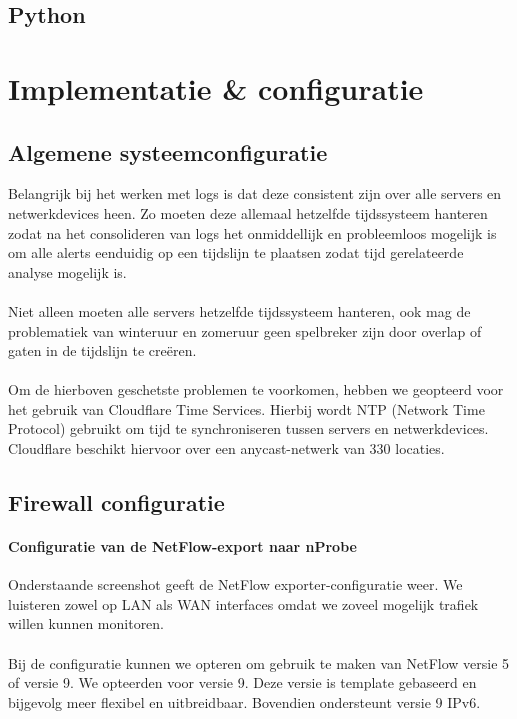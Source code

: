 \subsection{Python}

\section{Implementatie \& configuratie}
\subsection{Algemene systeemconfiguratie}
Belangrijk bij het werken met logs is dat deze consistent zijn over alle servers en netwerkdevices heen. Zo moeten deze allemaal hetzelfde tijdssysteem hanteren zodat na het consolideren van logs het onmiddellijk en probleemloos mogelijk is om alle alerts eenduidig op een tijdslijn te plaatsen zodat tijd gerelateerde analyse mogelijk is.

\paragraph{}
Niet alleen moeten alle servers hetzelfde tijdssysteem hanteren, ook mag de problematiek van winteruur en zomeruur geen spelbreker zijn door overlap of gaten in de tijdslijn te creëren.

\paragraph{}
Om de hierboven geschetste problemen te voorkomen, hebben we geopteerd voor het gebruik van Cloudflare Time Services. Hierbij wordt NTP (Network Time Protocol) gebruikt om tijd te synchroniseren tussen servers en netwerkdevices. Cloudflare beschikt hiervoor over een anycast-netwerk van 330 locaties.

\subsection{Firewall configuratie}

\paragraph{Configuratie van de NetFlow-export naar nProbe}
Onderstaande screenshot geeft de NetFlow exporter-configuratie weer.
We luisteren zowel op LAN als WAN interfaces omdat we zoveel mogelijk trafiek willen kunnen monitoren.

\paragraph{}
Bij de configuratie kunnen we opteren om gebruik te maken van NetFlow versie 5 of versie 9. We opteerden voor versie 9. Deze versie is template gebaseerd en bijgevolg meer flexibel en uitbreidbaar. Bovendien ondersteunt versie 9 IPv6.

